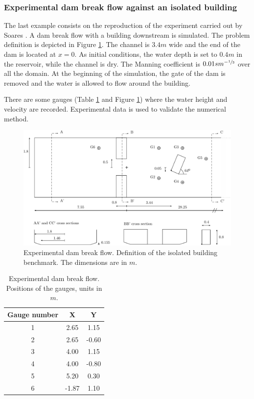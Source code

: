 \subsubsection{Experimental dam break flow against an isolated building}

The last example consists on the reproduction of the experiment carried out by Soares \cite{soares2007}.
A dam break flow with a building downstream is simulated. The problem definition is depicted in Figure \ref{experiment_sketch}. The channel is $3.4m$ wide and the end of the dam is located at $x=0$.
As initial conditions, the water depth is set to $0.4m$ in the reservoir, while the channel is dry. The Manning coefficient is $0.01sm^{-\sfrac{1}{3}}$ over all the domain.
At the beginning of the simulation, the gate of the dam is removed and the water is allowed to flow around the building.

There are some gauges (Table \ref{gauges_positions} and Figure \ref{experiment_sketch}) where the water height and velocity are recorded. Experimental data is used to validate the numerical method.

\begin{figure}[H]
\centering
\includegraphics[width=\textwidth]{img/eulerian/exp/sketch.pdf}
\caption{Experimental dam break flow. Definition of the isolated building benchmark. The dimensions are in $m$.}
\label{experiment_sketch}
\end{figure}

\begin{table}
\centering
\begin{tabular}{ccc}
\hline
Gauge number & X & Y \\ \hline
1 &  2.65 &  1.15 \\
2 &  2.65 & -0.60 \\
3 &  4.00 &  1.15 \\
4 &  4.00 & -0.80 \\
5 &  5.20 &  0.30 \\
6 & -1.87 &  1.10 \\ \hline
\end{tabular}
\caption{Experimental dam break flow. Positions of the gauges, units in $m$.}
\label{gauges_positions}
\end{table}

